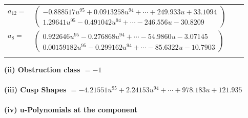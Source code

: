 \documentclass[1p]{elsarticle_modified}
\theoremstyle{definition}
\begin{document}
\begin{tabular}{m{7pt} m{180pt} m{7pt} m{180pt} }
\flushright $a_{12}=$&$\begin{pmatrix}-0.888517 u^{95}+0.0913258 u^{94}+\cdots+249.933 u+33.1094\\1.29641 u^{95}-0.491042 u^{94}+\cdots-246.556 u-30.8209\end{pmatrix}$ \\
\flushright $a_{8}=$&$\begin{pmatrix}0.922646 u^{95}-0.276868 u^{94}+\cdots-54.9860 u-3.07145\\0.00159182 u^{95}-0.299162 u^{94}+\cdots-85.6322 u-10.7903\end{pmatrix}$\\&\end{tabular}
\flushleft \textbf{(ii) Obstruction class $= -1$}\\~\\
\flushleft \textbf{(iii) Cusp Shapes $= -4.21551 u^{95}+2.24153 u^{94}+\cdots+978.183 u+121.935$}\\~\\
\newpage\renewcommand{\arraystretch}{1}
\flushleft \textbf{(iv) u-Polynomials at the component}\newline \\
\end{document}
